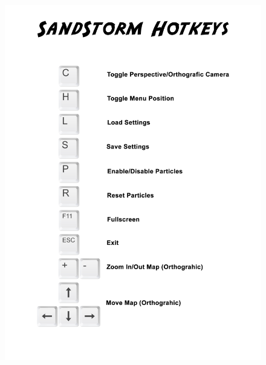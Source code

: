 \begin{Spacing}{\mylinespace}
	\begin{figure}[h!]
		\centering
		\vspace*{0px}
		\includegraphics[width=\columnwidth]{graphics/Hotkeys.png}
	\end{figure}
	
\end{Spacing}
\newpage
\clearpage
